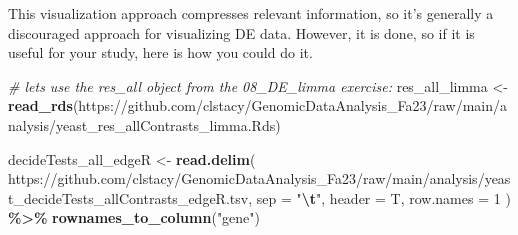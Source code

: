 \documentclass[
]{book}
\newenvironment{Shaded}{\begin{snugshade}}{\end{snugshade}}
\newcommand{\AttributeTok}[1]{\textcolor[rgb]{0.13,0.29,0.53}{#1}}
\newcommand{\CommentTok}[1]{\textcolor[rgb]{0.56,0.35,0.01}{\textit{#1}}}
\newcommand{\DecValTok}[1]{\textcolor[rgb]{0.00,0.00,0.81}{#1}}
\newcommand{\FunctionTok}[1]{\textcolor[rgb]{0.13,0.29,0.53}{\textbf{#1}}}
\newcommand{\NormalTok}[1]{#1}
\newcommand{\OtherTok}[1]{\textcolor[rgb]{0.56,0.35,0.01}{#1}}
\newcommand{\SpecialCharTok}[1]{\textcolor[rgb]{0.81,0.36,0.00}{\textbf{#1}}}
\newcommand{\StringTok}[1]{\textcolor[rgb]{0.31,0.60,0.02}{#1}}
\begin{document}
This visualization approach compresses relevant information, so it's generally a discouraged approach for visualizing DE data. However, it is done, so if it is useful for your study, here is how you could do it.

\begin{Shaded}
\begin{Highlighting}[]
\CommentTok{\# let\textquotesingle{}s use the res\_all object from the 08\_DE\_limma exercise:}
\NormalTok{res\_all\_limma }\OtherTok{\textless{}{-}} \FunctionTok{read\_rds}\NormalTok{(}\StringTok{\textquotesingle{}https://github.com/clstacy/GenomicDataAnalysis\_Fa23/raw/main/analysis/yeast\_res\_allContrasts\_limma.Rds\textquotesingle{}}\NormalTok{)}

\NormalTok{decideTests\_all\_edgeR }\OtherTok{\textless{}{-}}
  \FunctionTok{read.delim}\NormalTok{(}
    \StringTok{\textquotesingle{}https://github.com/clstacy/GenomicDataAnalysis\_Fa23/raw/main/analysis/yeast\_decideTests\_allContrasts\_edgeR.tsv\textquotesingle{}}\NormalTok{,}
    \AttributeTok{sep =} \StringTok{"}\SpecialCharTok{\textbackslash{}t}\StringTok{"}\NormalTok{,}
    \AttributeTok{header =}\NormalTok{ T,}
    \AttributeTok{row.names =} \DecValTok{1}
\NormalTok{  ) }\SpecialCharTok{\%\textgreater{}\%} \FunctionTok{rownames\_to\_column}\NormalTok{(}\StringTok{"gene"}\NormalTok{) }


\end{Highlighting}
\end{Shaded}
\end{document}
